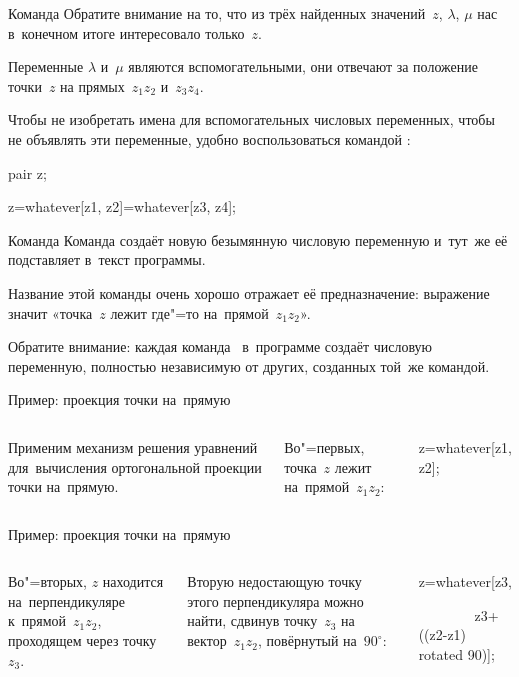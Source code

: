 \begin{frame}{Команда }
Обратите внимание на то, что из трёх найденных значений~$z$, $\lambda$, $\mu$
нас в~конечном итоге интересовало только~$z$.

Переменные $\lambda$ и~$\mu$ являются вспомогательными, они отвечают за
положение точки~$z$ на прямых~$z_1z_2$ и~$z_3z_4$.

Чтобы не изобретать имена для вспомогательных числовых переменных, чтобы не
объявлять эти переменные, удобно воспользоваться командой :
\begin{programlisting}
pair z;\par
z=whatever[z1, z2]=whatever[z3, z4];
\end{programlisting}
\end{frame}

\begin{frame}{Команда }
Команда  создаёт новую безымянную числовую переменную
и~тут~же её подставляет в~текст программы.

Название этой команды очень хорошо отражает её предназначение: выражение
 значит «точка~$z$ лежит где"=то
на~прямой~$z_1z_2$».

Обратите внимание: каждая команда~ в~программе создаёт
числовую переменную, полностью независимую от других, созданных той~же
командой.
\end{frame}

\begin{frame}{Пример: проекция точки на~прямую}
\begin{columns}
\centering
{}%
%
Применим механизм решения уравнений для~вычисления ортогональной проекции точки
на~прямую.

\pause
\bigskip
Во"=первых, точка~$z$ лежит на~прямой~$z_1z_2$:
\begin{programlisting}
z=whatever[z1, z2];
\end{programlisting}
\end{columns}
\end{frame}

\begin{frame}{Пример: проекция точки на~прямую}
\begin{columns}
\centering
{}
Во"=вторых, $z$ находится на~перпендикуляре к~прямой~$z_1z_2$, проходящем через
точку~$z_3$.

\bigskip

Вторую недостающую точку этого перпендикуляра можно найти, сдвинув точку~$z_3$
на вектор~$z_1z_2$, повёрнутый на~$90^\circ$:
\begin{programlisting}
z=whatever[z3,\par
~~~~~~~~z3+((z2-z1) rotated 90)];
\end{programlisting}
\end{columns}
\end{frame}

